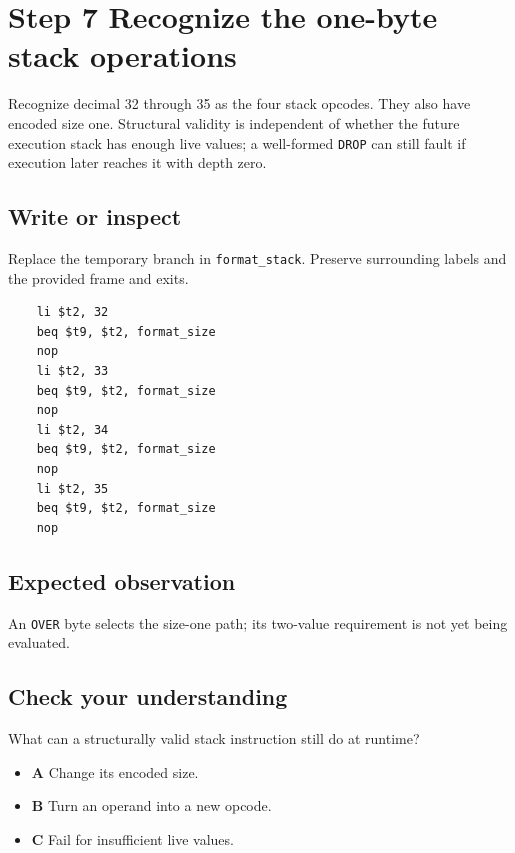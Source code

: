 \section{Step 7 Recognize the one-byte stack operations}\label{vm-s07}

Recognize decimal 32 through 35 as the four stack opcodes. They also have encoded size one. Structural validity is independent of whether the future execution stack has enough live values; a well-formed \texttt{DROP} can still fault if execution later reaches it with depth zero.

\subsection{Write or inspect}
Replace the temporary branch in \texttt{format\_stack}. Preserve surrounding labels and the provided frame and exits.

\begin{verbatim}
    li $t2, 32
    beq $t9, $t2, format_size
    nop
    li $t2, 33
    beq $t9, $t2, format_size
    nop
    li $t2, 34
    beq $t9, $t2, format_size
    nop
    li $t2, 35
    beq $t9, $t2, format_size
    nop
\end{verbatim}
\subsection{Expected observation}
An \texttt{OVER} byte selects the size-one path; its two-value requirement is not yet being evaluated.

\subsection{Check your understanding}
What can a structurally valid stack instruction still do at runtime?

\begin{itemize}
  \item \textbf{A} Change its encoded size.
  \item \textbf{B} Turn an operand into a new opcode.
  \item \textbf{C} Fail for insufficient live values.
\end{itemize}
